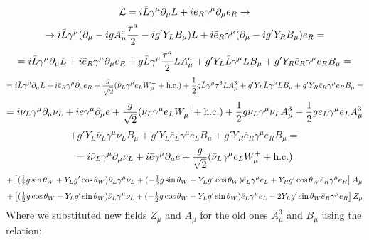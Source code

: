 \begin{equation*}
  {\mathcal L}=i\bar L\gamma^\mu\partial_\mu L+i\bar e_R \gamma^\mu\partial_\mu e_R \to
\end{equation*}
\begin{equation*}
  \to i\bar L\gamma^\mu(\partial_\mu-igA^a_\mu{\tau^a\over2}-ig'Y_LB_\mu) L +i\bar e_R \gamma^\mu(\partial_\mu-ig'Y_RB_\mu) e_R =
\end{equation*}
\begin{equation*}
  = i\bar L\gamma^\mu\partial_\mu L+i\bar e_R \gamma^\mu\partial_\mu e_R +g\bar L\gamma^\mu{\tau^a\over2}LA^a_\mu +g'Y_L\bar L\gamma^\mu LB_\mu +g'Y_R\bar e_R \gamma^\mu e_R B_\mu =
\end{equation*}
\begin{equation*}
  = i\bar L\gamma^\mu\partial_\mu L+i\bar e_R \gamma^\mu\partial_\mu e_R +{g\over\sqrt2}(\bar \nu_L\gamma^\mu e_L W^+_\mu + \hbox{h.c.}) +{1\over2}g\bar L\gamma^\mu\tau^3L A^3_\mu +g'Y_L\bar L\gamma^\mu LB_\mu +g'Y_R\bar e_R \gamma^\mu e_R B_\mu =
\end{equation*}
\begin{equation*}
  = i\bar \nu_L\gamma^\mu\partial_\mu \nu_L+i\bar e \gamma^\mu\partial_\mu e +{g\over\sqrt2}(\bar \nu_L\gamma^\mu e_L W^+_\mu + \hbox{h.c.}) +{1\over2}g\bar\nu_L\gamma^\mu\nu_LA^3_\mu -{1\over2}g\bar e_L\gamma^\mu e_LA^3_\mu
\end{equation*}
\begin{equation*}
  +g'Y_L\bar\nu_L\gamma^\mu\nu_LB_\mu +g'Y_L\bar e_L\gamma^\mu e_LB_\mu +g'Y_R\bar e_R \gamma^\mu e_R B_\mu =
\end{equation*}
\begin{equation*}
  = i\bar \nu_L\gamma^\mu\partial_\mu \nu_L+i\bar e \gamma^\mu\partial_\mu e +{g\over\sqrt2}(\bar \nu_L\gamma^\mu e_L W^+_\mu + \hbox{h.c.})
\end{equation*}
\begin{equation*}
  +\left[ ({\textstyle{1\over2}} g\sin\theta_W+Y_Lg'\cos\theta_W)\bar\nu_L\gamma^\mu\nu_L +(-{\textstyle{1\over2}} g\sin\theta_W +Y_Lg'\cos\theta_W)\bar e_L\gamma^\mu e_L +Y_Rg'\cos\theta_W\bar e_R\gamma^\mu e_R \right]A_\mu
\end{equation*}
\begin{equation*}
  +\left[ ({\textstyle{1\over2}} g\cos\theta_W-Y_Lg'\sin\theta_W)\bar\nu_L\gamma^\mu\nu_L +(-{\textstyle{1\over2}} g\cos\theta_W -Y_Lg'\sin\theta_W)\bar e_L\gamma^\mu e_L -2Y_Lg'\sin\theta_W\bar e_R\gamma^\mu e_R \right]Z_\mu
\end{equation*}
Where we substituted new fields $Z_\mu$ and $A_\mu$ for the old ones $A^3_\mu$ and $B_\mu$ using the relation: 
